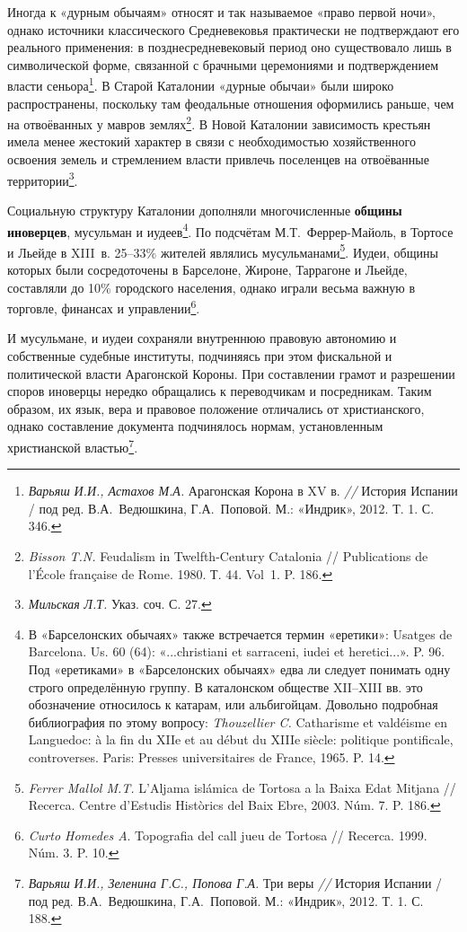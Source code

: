 Иногда к «дурным обычаям» относят и так называемое «право первой ночи», однако источники классического Средневековья практически не подтверждают его реального применения: в позднесредневековый период оно существовало лишь в символической форме, связанной с брачными церемониями и подтверждением власти сеньора\footnote{\emph{Варьяш}\emph{ И.И., Астахов М.А.} Арагонская Корона в XV в. \emph{// }История Испании / под ред. В.А.~Ведюшкина, Г.А.~Поповой. М.: «Индрик», 2012. Т. 1. С. 346.}. В Старой Каталонии «дурные обычаи» были широко распространены, поскольку там феодальные отношения оформились раньше, чем на отвоёванных у мавров землях\footnote{\emph{Bisson T.N.} Feudalism in Twelfth-Century Catalonia // Publications de l’École française de Rome. 1980. Т. 44. Vol~1. P. 186.}. В Новой Каталонии зависимость крестьян имела менее жестокий характер в связи с необходимостью хозяйственного освоения земель и стремлением власти привлечь поселенцев на отвоёванные территории\footnote{\emph{Мильская}\emph{ Л.Т.} Указ. соч. С. 27.}.

Социальную структуру Каталонии дополняли многочисленные \textbf{общины иноверцев}, мусульман и иудеев\footnote{В «Барселонских обычаях» также встречается термин «еретики»: Usatges de Barcelona. Us. 60 (64): «...christiani et sarraceni, iudei et heretici...». P. 96. Под «еретиками» в «Барселонских обычаях» едва ли следует понимать одну строго определённую группу. В каталонском обществе XII--XIII вв. это обозначение относилось к катарам, или альбигойцам. Довольно подробная библиография по этому вопросу: \emph{Thouzellier C. }Catharisme et valdéisme en Languedoc: à la fin du XIIe et au début du XIIIe siècle: politique pontificale, controverses. Paris: Presses universitaires de France, 1965. P. 14.}. По подсчётам М.Т.~Феррер-Майоль, в Тортосе и Льейде в XIII~в. 25--33\% жителей являлись мусульманами\footnote{\emph{Ferrer Mallol M.T.} L'Aljama islámica de Tortosa a la Baixa Edat Mitjana // Recerca. Centre d'Estudis Històrics del Baix Ebre, 2003. Núm. 7. P. 186.}. Иудеи, общины которых были сосредоточены в Барселоне, Жироне, Таррагоне и Льейде, составляли до 10\% городского населения, однако играли весьма важную в торговле, финансах и управлении\footnote{\emph{Curto Homedes A}. Topografia del call jueu de Tortosa // Recerca. 1999. Núm. 3. P. 10.}.

И мусульмане, и иудеи сохраняли внутреннюю правовую автономию и собственные судебные институты, подчиняясь при этом фискальной и политической власти Арагонской Короны. При составлении грамот и разрешении споров иноверцы нередко обращались к переводчикам и посредникам. Таким образом, их язык, вера и правовое положение отличались от христианского, однако составление документа подчинялось нормам, установленным христианской властью\footnote{\emph{Варьяш}\emph{ И.И., Зеленина Г.С., Попова Г.А. }Три веры \emph{// }История Испании / под ред. В.А.~Ведюшкина, Г.А.~Поповой. М.: «Индрик», 2012. Т. 1. С. 188.}.
